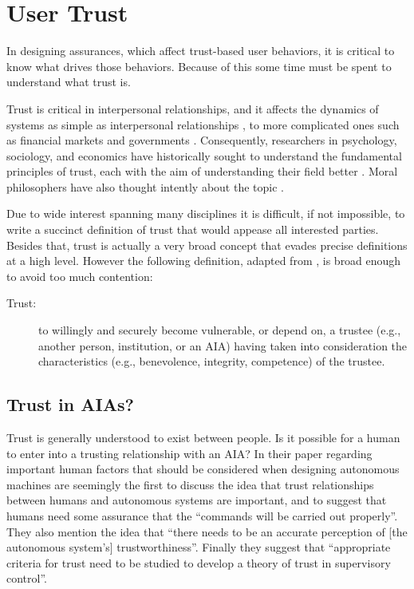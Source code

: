 \section{User Trust}
    In designing assurances, which affect trust-based user behaviors, it is critical to know what drives those behaviors. Because of this some time must be spent to understand what trust is. 

    Trust is critical in interpersonal relationships, and it affects the dynamics of systems as simple as interpersonal relationships \cite{Lewicki2006-hj}, to more complicated ones such as financial markets and governments \cite{Fukuyama1995-un}. Consequently, researchers in psychology, sociology, and economics have historically sought to understand the fundamental principles of trust, each with the aim of understanding their field better \cite{Gambetta1988-pi}. Moral philosophers have also thought intently about the topic \cite{Baier1986-im}.

    Due to wide interest spanning many disciplines it is difficult, if not impossible, to write a succinct definition of trust that would appease all interested parties. Besides that, trust is actually a very broad concept that evades precise definitions at a high level. However the following definition, adapted from \cite{McKnight2004-vv}, is broad enough to avoid too much contention:

    \begin{description}
        \item [Trust:] to willingly and securely become vulnerable, or depend on, a trustee (e.g., another person, institution, or an AIA) having taken into consideration the characteristics (e.g., benevolence,  integrity,  competence)  of  the  trustee.
    \end{description}

    \subsection{Trust in AIAs?}
        Trust is generally understood to exist between people. Is it possible for a human to enter into a trusting relationship with an AIA? In their paper regarding important human factors that should be considered when designing autonomous machines \cite{Sheridan1984-kx} are seemingly the first to discuss the idea that trust relationships between humans and autonomous systems are important, and to suggest that humans need some assurance that the ``commands will be carried out properly''. They also mention the idea that ``there needs to be an accurate perception of [the autonomous system's] trustworthiness''. Finally they suggest that ``appropriate criteria for trust need to be studied to develop a theory of trust in supervisory control''.

